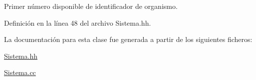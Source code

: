Primer número disponible de identificador de organismo. 



Definición en la línea 48 del archivo Sistema.\+hh.



La documentación para esta clase fue generada a partir de los siguientes ficheros\+:\begin{DoxyCompactItemize}
\item 
\hyperlink{_sistema_8hh}{Sistema.\+hh}\item 
\hyperlink{_sistema_8cc}{Sistema.\+cc}\end{DoxyCompactItemize}
